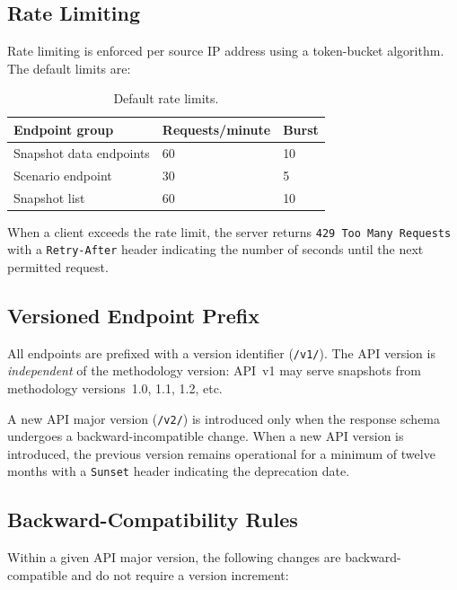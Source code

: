 \subsection{Rate Limiting}\label{sec:api:rate-limiting}

Rate limiting is enforced per source IP address using a token-bucket
algorithm.  The default limits are:

\begin{table}[htbp]
  \centering\small
  \caption{Default rate limits.}\label{tab:api-rate-limits}
  \begin{tabular}{@{}l l l@{}}
    \toprule
    \textbf{Endpoint group} & \textbf{Requests/minute} & \textbf{Burst} \\
    \midrule
    Snapshot data endpoints   & 60  & 10 \\
    Scenario endpoint         & 30  & 5 \\
    Snapshot list              & 60  & 10 \\
    \bottomrule
  \end{tabular}
\end{table}

When a client exceeds the rate limit, the server returns
\texttt{429 Too Many Requests} with a \texttt{Retry-After} header
indicating the number of seconds until the next permitted request.

\subsection{Versioned Endpoint Prefix}\label{sec:api:versioning}

All endpoints are prefixed with a version identifier (\texttt{/v1/}).  The
API version is \emph{independent} of the methodology version: API~v1 may
serve snapshots from methodology versions~1.0, 1.1, 1.2, etc.

A new API major version (\texttt{/v2/}) is introduced only when the response
schema undergoes a backward-incompatible change.  When a new API version is
introduced, the previous version remains operational for a minimum of
twelve months with a \texttt{Sunset} header indicating the deprecation date.

\subsection{Backward-Compatibility Rules}\label{sec:api:compat}

Within a given API major version, the following changes are
backward-compatible and do not require a version increment:

